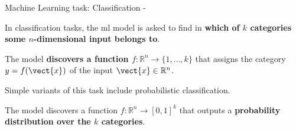 

\begin{frame}[t,allowframebreaks]{
    Machine Learning task: Classification - }

    \begin{itemize}
        {
            \item
            In \gls{classification} tasks, 
            the \gls{ml} model 
            is asked to find in {\bf which of $k$ categories 
            some $n$-dimensional input belongs to}.\\
            \vspace{0.1cm}
            \begin{itemize}
                {\small
                \item        
                The model {\bf discovers a function 
                $f: \mathbb{R}^n \rightarrow \{1,\dots,k\}$}
                that assigns the category $y = f(\vect{x})$ 
                of the input $\vect{x} \in \mathbb{R}^n$.\\
                }
            \end{itemize}
            \vspace{0.1cm}
            \item
            Simple variants of this task include
            \gls{probabilistic classification}.\\
            \vspace{0.1cm}
            \begin{itemize}
                {\small
                \item        
                The model discovers a 
                function $f: \mathbb{R}^n \rightarrow [0,1]^k$
                that outputs a {\bf probability distribution 
                over the $k$ categories}.\\
                }
            \end{itemize}
        }
    \end{itemize}

\end{frame}